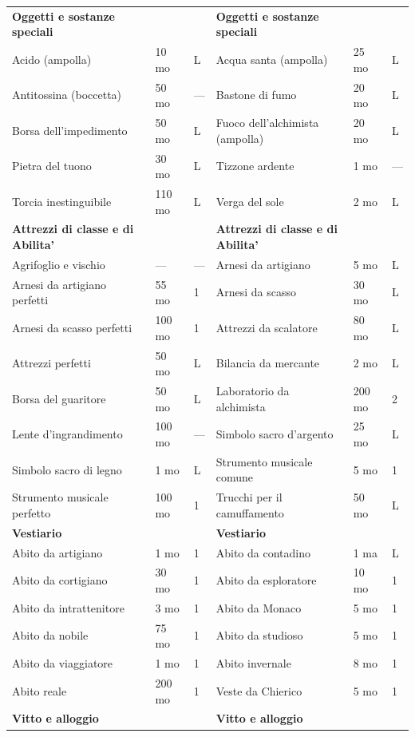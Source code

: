 \documentclass[a4paper,11pt,twoside,openany]{book}
\begin{document}
\begin{tabularx}{0.95\textwidth}{XllXll}
	\textbf{Oggetti e sostanze speciali}&    & & \textbf{Oggetti e sostanze speciali}&& \\
	Acido (ampolla)   & 10 mo    & L& Acqua santa (ampolla)   & 25 mo& L\\
	Antitossina (boccetta)  & 50 mo    & —& Bastone di fumo   & 20 mo& L\\
	Borsa dell’impedimento  & 50 mo    & L& Fuoco dell’alchimista (ampolla)& 20 mo& L\\
	Pietra del tuono  & 30 mo    & L& Tizzone ardente   & 1 mo& —\\
	Torcia inestinguibile   & 110 mo   & L& Verga del sole    & 2 mo& L\\
	\textbf{Attrezzi di classe e di Abilita'} &    & & \textbf{Attrezzi di classe e di Abilita'} && \\
	Agrifoglio e vischio    & —  & —& Arnesi da artigiano& 5 mo& L\\
	Arnesi da artigiano perfetti  & 55 mo    & 1& Arnesi da scasso  & 30 mo& L\\
	Arnesi da scasso perfetti& 100 mo   & 1& Attrezzi da scalatore   & 80 mo& L\\
	Attrezzi perfetti & 50 mo    & L& Bilancia da mercante    & 2 mo& L\\
	Borsa del guaritore& 50 mo    & L& Laboratorio da alchimista& 200 mo    & 2\\
	Lente d’ingrandimento   & 100 mo   & —& Simbolo sacro d’argento & 25 mo& L\\
	Simbolo sacro di legno  & 1 mo& L& Strumento musicale comune& 5 mo& 1\\
	Strumento musicale perfetto   & 100 mo   & 1& Trucchi per il camuffamento   & 50 mo& L\\
	\textbf{Vestiario}&    & & \textbf{Vestiario}&& \\
	Abito da artigiano& 1 mo& 1& Abito da contadino& 1 ma& L\\
	Abito da cortigiano& 30 mo    & 1& Abito da esploratore    & 10 mo& 1\\
	Abito da intrattenitore & 3 mo& 1& Abito da Monaco   & 5 mo& 1\\
	Abito da nobile   & 75 mo    & 1& Abito da studioso & 5 mo& 1\\
	Abito da viaggiatore    & 1 mo& 1& Abito invernale   & 8 mo& 1\\
	Abito reale & 200 mo   & 1& Veste da Chierico & 5 mo& 1\\
	\textbf{Vitto e alloggio}&    & & \textbf{Vitto e alloggio}&& \\

\end{tabularx}
\end{document}
